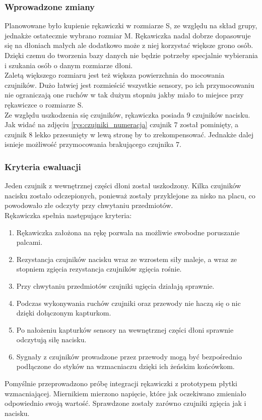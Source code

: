 \documentclass{article}
\begin{document}
\subsubsection{Wprowadzone zmiany}
Planowowane było kupienie rękawiczki w rozmiarze S, ze względu na skład grupy, jednakże ostatecznie wybrano rozmiar M. Rękawiczka nadal dobrze dopasowuje się na dłoniach małych ale dodatkowo może z niej korzystać większe grono osób. Dzięki czemu do tworzenia bazy danych nie będzie potrzeby specjalnie wybierania i szukania osób o danym rozmiarze dłoni.\\
Zaletą większego rozmiaru jest też większa powierzchnia do mocowania czujników. Dużo łatwiej jest rozmieścić wszystkie sensory, po ich przymocowaniu nie ograniczają one ruchów w tak dużym stopniu jakby miało to miejsce przy rękawiczce o rozmiarze S.\\
Ze względu uszkodzenia się czujników, rękawiczka posiada 9 czujników nacisku. Jak widać na zdjęciu \ref{rys:czujniki_numeracja} czujnik 7 został pominięty, a czujnik 8 lekko przesunięty w lewą stronę by to zrekompensować. Jednakże dalej isnieje możliwość przymocowania brakującego czujnika 7.

\subsubsection{Kryteria ewaluacji}
Jeden czujnik z wewnętrznej części dłoni został uszkodzony. Kilka czujników nacisku zostało odczepionych, ponieważ zostały przyklejone za nisko na placu, co powodowało złe odczyty przy chwytaniu przedmiotów. \\
Rękawiczka spełnia następujące kryteria:\\
\begin{enumerate}
  \item Rękawiczka założona na rękę pozwala na możliwie swobodne poruszanie palcami.
  \item Rezystancja czujników nacisku wraz ze wzrostem siły maleje, a wraz ze stopniem zgięcia rezystancja czujników zgięcia rośnie.
	\item Przy chwytaniu przedmiotów czujniki ugięcia działają sprawnie.
	\item Podczas wykonywania ruchów czujniki oraz przewody nie haczą się o nic dzięki dołączonym kapturkom.
	\item Po nałożeniu kapturków sensory na wewnętrznej części dłoni sprawnie odczytują siłę nacisku.
	\item Sygnały z czujników prowadzone przez przewody mogą być bezpośrednio podłączone do styków na wzmacniaczu dzięki ich żeńskim końcówkom.
\end{enumerate}
Pomyślnie przeprowadzono próbę integracji rękawiczki z prototypem płytki wzmacniającej. Miernikiem mierzono napięcie, które jak oczekiwano zmieniało odpowiednio swoją wartość. Sprawdzone zostały zarówno czujniki zgięcia jak i nacisku.
\end{document}
